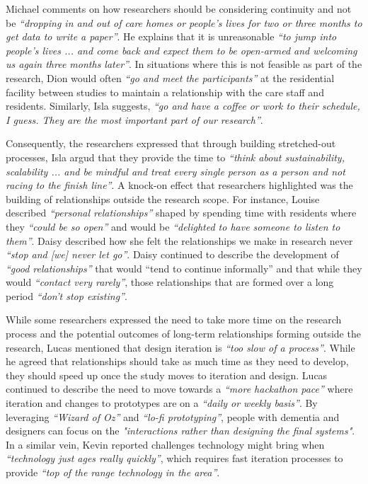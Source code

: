Michael comments on how researchers should be considering continuity and not be \textit{``dropping in and out of care homes or people's lives for two or three months to get data to write a paper''}. He explains that it is unreasonable \textit{``to jump into people's lives ... and come back and expect them to be open-armed and welcoming us again three months later''}. In situations where this is not feasible as part of the research, Dion would often \textit{``go and meet the participants''} at the residential facility between studies to maintain a relationship with the care staff and residents. Similarly, Isla suggests, \textit{``go and have a coffee or work to their schedule, I guess. They are the most important part of our research''}.

Consequently, the researchers expressed that through building stretched-out processes, Isla argud that they provide the time to \textit{``think about sustainability, scalability ... and be mindful and treat every single person as a person and not racing to the finish line''}. A knock-on effect that researchers highlighted was the building of relationships outside the research scope. For instance, Louise described \textit{``personal relationships''} shaped by spending time with residents where they \textit{``could be so open''} and would be \textit{``delighted to have someone to listen to them''}. Daisy described how she felt the relationships we make in research never \textit{``stop and [we] never let go''}. Daisy continued to describe the development of \textit{``good relationships''} that would ``tend to continue informally'' and that while they would \textit{``contact very rarely''}, those relationships that are formed over a long period \textit{``don't stop existing''}. 

While some researchers expressed the need to take more time on the research process and the potential outcomes of long-term relationships forming outside the research, Lucas mentioned that design iteration is \textit{``too slow of a process''}. While he agreed that relationships should take as much time as they need to develop, they should speed up once the study moves to iteration and design. Lucas continued to describe the need to move towards a \textit{``more hackathon pace''} where iteration and changes to prototypes are on a \textit{``daily or weekly basis''}. By leveraging \textit{``Wizard of Oz''} and \textit{``lo-fi prototyping''}, people with dementia and designers can focus on the \textit{"interactions rather than designing the final systems"}. In a similar vein, Kevin reported challenges technology might bring when \textit{``technology just ages really quickly''}, which requires fast iteration processes to provide \textit{``top of the range technology in the area''}. 

